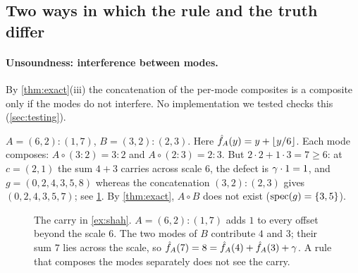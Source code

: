 \subsection{Two ways in which the rule and the truth differ}\label{sec:deviations}

\paragraph{Unsoundness: interference between modes.}
By \cref{thm:exact}(iii) the concatenation of the per-mode composites is a composite only if the
modes do not interfere. No implementation we tested checks this (\cref{sec:testing}).

\begin{example}\label{ex:shah}
$A=(6,2):(1,7)$, $B=(3,2):(2,3)$. Here $\hat{f}_{A}(y)=y+\left\lfloor y/6 \right\rfloor$. Each mode composes:
$A\circ(3:2)=3:2$ and $A\circ(2:3)=2:3$. But $2\cdot2+1\cdot3=7\ge6$: at $c=(2,1)$ the sum
$4+3$ carries across scale $6$, the defect is $\gamma\cdot1=1$, and $g=(0,2,4,3,5,8)$ whereas the
concatenation $(3,2):(2,3)$ gives $(0,2,4,3,5,7)$; see \cref{fig:carry}. By \cref{thm:exact},
$A\circ B$ does not exist ($\operatorname{spec}(g)=\{3,5\}$).
\end{example}

\begin{figure}[t]\centering
{}
\caption{The carry in \cref{ex:shah}. $A=(6,2):(1,7)$ adds $1$ to every offset beyond the scale
$6$. The two modes of $B$ contribute $4$ and $3$; their sum $7$ lies across the scale, so
$\hat{f}_{A}(7)=8=\hat{f}_{A}(4)+\hat{f}_{A}(3)+\gamma$. A rule that composes the modes separately does not see
the carry.}\label{fig:carry}
\end{figure}

